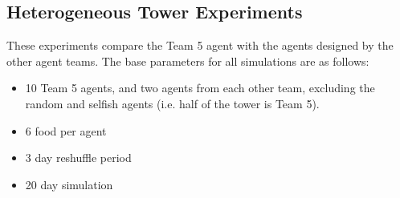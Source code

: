 \subsection*{Heterogeneous Tower Experiments}
These experiments compare the Team 5 agent with the agents designed by the other agent teams. The base parameters for all simulations are as follows:
\begin{itemize}
    \item 10 Team 5 agents, and two agents from each other team, excluding the random and selfish agents (i.e. half of the tower is Team 5).
    \item 6 food per agent
    \item 3 day reshuffle period
    \item 20 day simulation
\end{itemize}


